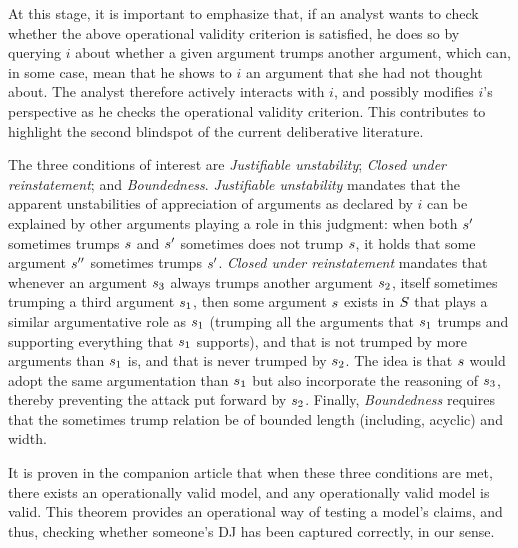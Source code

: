 \documentclass[version=3.21, pagesize, twoside=off, bibliography=totoc, DIV=calc, fontsize=12pt, a4paper, french, english]{scrartcl}
\begin{document}
At this stage, it is important to emphasize that, if an analyst wants to check whether the above operational validity criterion is satisfied, he does so by querying $i$ about whether a given argument trumps another argument, which can, in some case, mean that he shows to $i$ an argument that she had not thought about. 
The analyst therefore actively interacts with $i$, and possibly modifies $i$’s perspective as he checks the operational validity criterion. 
This contributes to highlight the second blindspot of the current deliberative literature.

The three conditions of interest are \emph{Justifiable unstability}; \emph{Closed under reinstatement}; and \emph{Boundedness}. \emph{Justifiable unstability} mandates that the apparent unstabilities of appreciation of arguments as declared by $i$ can be explained by other arguments playing a role in this judgment: when both $s'$ sometimes trumps $s$ and $s'$ sometimes does not trump $s$, it holds that some argument $s''$ sometimes trumps $s'$. \emph{Closed under reinstatement} mandates that whenever an argument $s_3$ always trumps another argument $s_2$, itself sometimes trumping a third argument $s_1$, then some argument $s$ exists in $S$ that plays a similar argumentative role as $s_1$ (trumping all the arguments that $s_1$ trumps and supporting everything that $s_1$ supports), and that is not trumped by more arguments than $s_1$ is, and that is never trumped by $s_2$. The idea is that $s$ would adopt the same argumentation than $s_1$ but also incorporate the reasoning of $s_3$, thereby preventing the attack put forward by $s_2$. Finally, \emph{Boundedness} requires that the sometimes trump relation be of bounded length (including, acyclic) and width.

It is proven in the companion article that when these three conditions are met, there exists an operationally valid model, and any operationally valid model is valid. This theorem provides an operational way of testing a model’s claims, and thus, checking whether someone’s \ac{DJ} has been captured correctly, in our sense.
\end{document}
